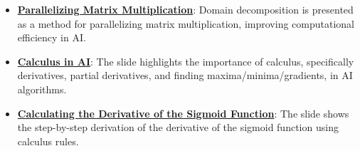 \documentclass{article}%
\begin{document}
\begin{itemize}[leftmargin=*]
\item \href{\url{https://purdue.brightspace.com/d2l/common/assets/pdfjs-d2l-dist/1.0.14-legacy/web/viewer.html?file=\%252Fcontent\%252Fenforced\%252F1095467-wl.202510.CS.24300.001\%252F04L1-Linear\%20Algebra\%20Primer.pdf\%253Fou\%253D1095467\&lang=en-us\&container=d2l-fileviewer-rendered-pdf\&fullscreen=d2l-fileviewer-rendered-pdf-dialog\&height=667}#page=18}{\textbf{Parallelizing Matrix Multiplication}}: Domain decomposition is presented as a method for parallelizing matrix multiplication, improving computational efficiency in AI.%
\item \href{\url{https://purdue.brightspace.com/d2l/common/assets/pdfjs-d2l-dist/1.0.14-legacy/web/viewer.html?file=\%252Fcontent\%252Fenforced\%252F1095467-wl.202510.CS.24300.001\%252F04L1-Linear\%20Algebra\%20Primer.pdf\%253Fou\%253D1095467\&lang=en-us\&container=d2l-fileviewer-rendered-pdf\&fullscreen=d2l-fileviewer-rendered-pdf-dialog\&height=667}#page=19}{\textbf{Calculus in AI}}: The slide highlights the importance of calculus, specifically derivatives, partial derivatives, and finding maxima/minima/gradients, in AI algorithms.%
\item \href{\url{https://purdue.brightspace.com/d2l/common/assets/pdfjs-d2l-dist/1.0.14-legacy/web/viewer.html?file=\%252Fcontent\%252Fenforced\%252F1095467-wl.202510.CS.24300.001\%252F04L1-Linear\%20Algebra\%20Primer.pdf\%253Fou\%253D1095467\&lang=en-us\&container=d2l-fileviewer-rendered-pdf\&fullscreen=d2l-fileviewer-rendered-pdf-dialog\&height=667}#page=21}{\textbf{Calculating the Derivative of the Sigmoid Function}}: The slide shows the step-by-step derivation of the derivative of the sigmoid function using calculus rules.%
\end{itemize}%
\end{document}
